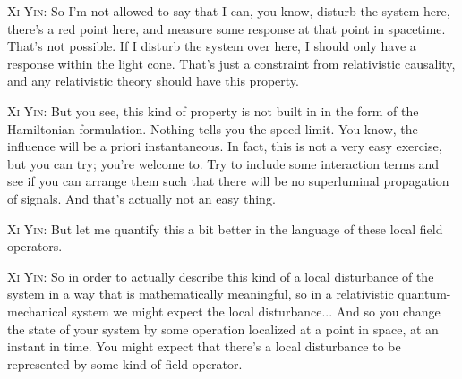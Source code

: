 \noindent\textsc{Xi Yin:} So I'm not allowed to say that I can, you know, disturb the system here, there's a red point here, and measure some response at that point in spacetime. That's not possible. If I disturb the system over here, I should only have a response within the light cone. That's just a constraint from relativistic causality, and any relativistic theory should have this property.\par

\noindent\textsc{Xi Yin:} But you see, this kind of property is not built in in the form of the Hamiltonian formulation. Nothing tells you the speed limit. You know, the influence will be a priori instantaneous. In fact, this is not a very easy exercise, but you can try; you're welcome to. Try to include some interaction terms and see if you can arrange them such that there will be no superluminal propagation of signals. And that's actually not an easy thing.\par

\noindent\textsc{Xi Yin:} But let me quantify this a bit better in the language of these local field operators.\par

\noindent\textsc{Xi Yin:} So in order to actually describe this kind of a local disturbance of the system in a way that is mathematically meaningful, so in a relativistic quantum-mechanical system we might expect the local disturbance... And so you change the state of your system by some operation localized at a point in space, at an instant in time. You might expect that there's a local disturbance to be represented by some kind of field operator.\par

